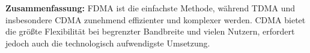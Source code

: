 \begin{ohmchapter}
\noindent \textbf{Zusammenfassung:} FDMA ist die einfachste Methode, während TDMA und insbesondere CDMA zunehmend effizienter und komplexer werden. CDMA bietet die größte Flexibilität bei begrenzter Bandbreite und vielen Nutzern, erfordert jedoch auch die technologisch aufwendigste Umsetzung.



\end{ohmchapter}  
